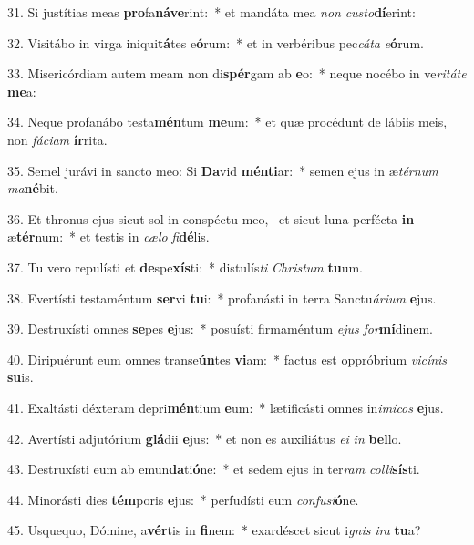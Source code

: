 31. Si justítias meas \textbf{pro}fa\textbf{ná}\textbf{ve}rint:~*  et mandáta mea \textit{non} \textit{cus}\textit{to}\textbf{dí}erint:\

32. Visitábo in virga iniqui\textbf{tá}tes e\textbf{ó}rum:~*  et in verbéribus pec\textit{cá}\textit{ta} \textit{e}\textbf{ó}rum.\

33. Misericórdiam autem meam non di\textbf{spér}gam ab \textbf{e}o:~*  neque nocébo in ve\textit{ri}\textit{tá}\textit{te} \textbf{me}a:\

34. Neque profanábo testa\textbf{mén}tum \textbf{me}um:~*  et quæ procédunt de lábiis meis, non \textit{fá}\textit{ci}\textit{am} \textbf{ír}rita.\

35. Semel jurávi in sancto meo: Si \textbf{Da}vid \textbf{mén}\textbf{ti}ar:~*  semen ejus in æ\textit{tér}\textit{num} \textit{ma}\textbf{né}bit.\

36. Et thronus ejus sicut sol in conspéctu meo, \dag\  et sicut luna perfécta \textbf{in} æ\textbf{tér}num:~*  et testis in \textit{cæ}\textit{lo} \textit{fi}\textbf{dé}lis.\

37. Tu vero repulísti et \textbf{de}spe\textbf{xís}ti:~*  distulís\textit{ti} \textit{Chris}\textit{tum} \textbf{tu}um.\

38. Evertísti testaméntum \textbf{ser}vi \textbf{tu}i:~*  profanásti in terra Sanctu\textit{á}\textit{ri}\textit{um} \textbf{e}jus.\

39. Destruxísti omnes \textbf{se}pes \textbf{e}jus:~*  posuísti firmaméntum \textit{e}\textit{jus} \textit{for}\textbf{mí}dinem.\

40. Diripuérunt eum omnes transe\textbf{ún}tes \textbf{vi}am:~*  factus est oppróbrium \textit{vi}\textit{cí}\textit{nis} \textbf{su}is.\

41. Exaltásti déxteram depri\textbf{mén}tium \textbf{e}um:~*  lætificásti omnes in\textit{i}\textit{mí}\textit{cos} \textbf{e}jus.\

42. Avertísti adjutórium \textbf{glá}dii \textbf{e}jus:~*  et non es auxiliátus \textit{e}\textit{i} \textit{in} \textbf{bel}lo.\

43. Destruxísti eum ab emun\textbf{da}ti\textbf{ó}ne:~*  et sedem ejus in ter\textit{ram} \textit{col}\textit{li}\textbf{sís}ti.\

44. Minorásti dies \textbf{tém}poris \textbf{e}jus:~*  perfudísti eum \textit{con}\textit{fu}\textit{si}\textbf{ó}ne.\

45. Usquequo, Dómine, a\textbf{vér}tis in \textbf{fi}nem:~*  exardéscet sicut i\textit{gnis} \textit{i}\textit{ra} \textbf{tu}a?\

